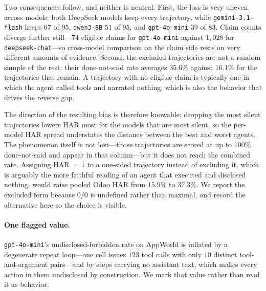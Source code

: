 \documentclass{article} %
\begin{document}
Two consequences follow, and neither is neutral. First, the loss is very uneven
across models: both DeepSeek models keep every trajectory, while
\texttt{gemini-3.1-flash} keeps $67$ of $95$, \texttt{qwen3-8B} $51$ of $95$,
and \texttt{gpt-4o-mini} $39$ of $83$. Claim counts diverge further still---$74$
eligible claims for \texttt{gpt-4o-mini} against $1{,}028$ for
\texttt{deepseek-chat}---so cross-model comparison on the claim side rests on
very different amounts of evidence. Second, the excluded trajectories are not a
random sample of the rest: their done-not-said rate averages $35.6\%$ against
$16.1\%$ for the trajectories that remain. A trajectory with no eligible claim
is typically one in which the agent called tools and narrated nothing, which is
also the behavior that drives the reverse gap.

The direction of the resulting bias is therefore knowable: dropping the most
silent trajectories lowers HAR most for the models that are most silent, so the
per-model HAR spread understates the distance between the best and worst agents.
The phenomenon itself is not lost---those trajectories are scored at up to
$100\%$ done-not-said and appear in that column---but it does not reach the
combined rate. Assigning HAR $= 1$ to a one-sided trajectory instead of
excluding it, which is arguably the more faithful reading of an agent that
executed and disclosed nothing, would raise pooled Odoo HAR from $15.9\%$ to
$37.3\%$. We report the excluded form because $0/0$ is undefined rather than
maximal, and record the alternative here so the choice is visible.

\paragraph{One flagged value.} \texttt{gpt-4o-mini}'s undisclosed-forbidden rate
on AppWorld is inflated by a degenerate repeat loop---one cell issues $123$ tool
calls with only $10$ distinct tool-and-argument pairs---and by steps carrying no
assistant text, which makes every action in them undisclosed by construction. We
mark that value rather than read it as behavior.

\end{document}

